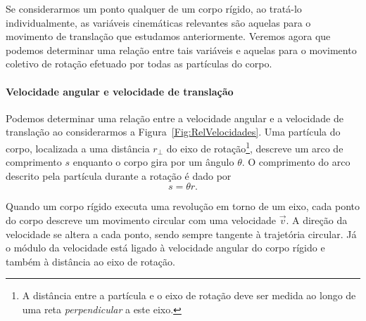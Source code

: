 Se considerarmos um ponto qualquer de um corpo rígido, ao tratá-lo individualmente, as variáveis cinemáticas relevantes são aquelas para o movimento de translação que estudamos anteriormente. Veremos agora que podemos determinar uma relação entre tais variáveis e aquelas para o movimento coletivo de rotação efetuado por todas as partículas do corpo.

\paragraph{Velocidade angular e velocidade de translação}

Podemos determinar uma relação entre a velocidade angular e a velocidade de translação ao considerarmos a Figura~\ref{Fig:RelVelocidades}. Uma partícula do corpo, localizada a uma distância $r_\perp$ do eixo de rotação\footnote[][-4cm]{A distância entre a partícula e o eixo de rotação deve ser medida ao longo de uma reta \emph{perpendicular} a este eixo.}, descreve um arco de comprimento $s$ enquanto o corpo gira por um ângulo $\theta$. O comprimento do arco descrito pela partícula durante a rotação é dado por
\begin{equation}
    s = \theta r.
\end{equation}

\begin{marginfigure}[-3cm]
\centering
{}
\caption{Quando um corpo rígido executa uma revolução em torno de um eixo, cada ponto do corpo descreve um movimento circular com uma velocidade $\vec{v}$. A direção da velocidade se altera a cada ponto, sendo sempre tangente à trajetória circular. Já o módulo da velocidade está ligado à velocidade angular do corpo rígido e também à distância ao eixo de rotação. \label{Fig:RelVelocidades}}
\end{marginfigure}

